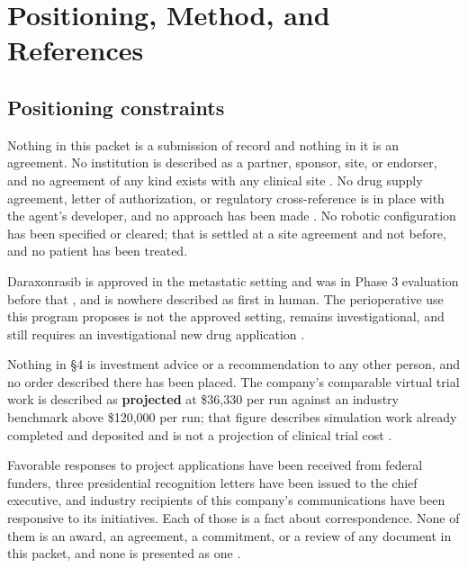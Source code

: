 \section{Positioning, Method, and References}

\subsection{Positioning constraints}

Nothing in this packet is a submission of record and nothing in it is an
agreement. No institution is described as a partner, sponsor, site, or endorser,
and no agreement of any kind exists with any clinical site
\cite{ucsdmoores2026}. No drug supply agreement, letter of authorization, or
regulatory cross-reference is in place with the agent's developer, and no
approach has been made \cite{revmedexternal2026}. No robotic configuration has
been specified or cleared; that is settled at a site agreement and not before,
and no patient has been treated.

Daraxonrasib is approved in the metastatic setting and was in Phase 3 evaluation
before that \cite{fdarasonque2026,rasolute302}, and is nowhere described as first
in human. The perioperative use this program proposes is not the approved
setting, remains investigational, and still requires an investigational new drug
application \cite{ecfr2026part312}.

Nothing in \S4 is investment advice or a recommendation to any other person, and
no order described there has been placed. The company's comparable virtual trial
work is described as \textbf{projected} at \$36,330 per run against an industry
benchmark above \$120,000 per run; that figure describes simulation work already
completed and deposited and is not a projection of clinical trial cost
\cite{capitalplan2026}.

Favorable responses to project applications have been received from federal
funders, three presidential recognition letters have been issued to the chief
executive, and industry recipients of this company's communications have been
responsive to its initiatives. Each of those is a fact about correspondence. None
of them is an award, an agreement, a commitment, or a review of any document in
this packet, and none is presented as one \cite{movein2026}.

